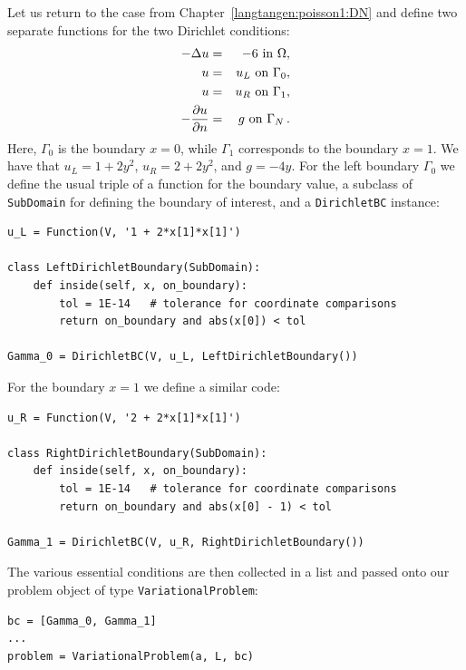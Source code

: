 Let us
return to the case from Chapter~\ref{langtangen:poisson1:DN}
and define two separate functions for
the two Dirichlet conditions:
\begin{eqnarray*}
    - \Delta u &=& -6 \mbox{ in } \Omega, \\
    u &=& u_L \mbox{ on } \Gamma_0, \\
    u &=& u_R \mbox{ on } \Gamma_1, \\
    - {\partial u\over\partial n} &=& g \mbox{ on } \Gamma_N \thinspace .
\end{eqnarray*}
Here, $\Gamma_0$ is the boundary $x=0$, while
$\Gamma_1$ corresponds to the boundary $x=1$.
We have that $u_L = 1 + 2y^2$, $u_R = 2 + 2y^2$, and $g=-4y$.
For the left boundary $\Gamma_0$ we
define
the usual triple of a function for the boundary value,
a subclass of {\fontsize{12pt}{12pt}\texttt{SubDomain}} for defining
the boundary of interest, and a {\fontsize{12pt}{12pt}\texttt{DirichletBC}} instance:
\begin{Verbatim}[fontsize=\fontsize{10pt}{10pt},tabsize=8,baselinestretch=1.05,
fontfamily=tt,xleftmargin=7mm]
u_L = Function(V, '1 + 2*x[1]*x[1]')

class LeftDirichletBoundary(SubDomain):
    def inside(self, x, on_boundary):
        tol = 1E-14   # tolerance for coordinate comparisons
        return on_boundary and abs(x[0]) < tol

Gamma_0 = DirichletBC(V, u_L, LeftDirichletBoundary())
\end{Verbatim}
\noindent
For the boundary $x=1$ we define a similar code:
\begin{Verbatim}[fontsize=\fontsize{10pt}{10pt},tabsize=8,baselinestretch=1.05,
fontfamily=tt,xleftmargin=7mm]
u_R = Function(V, '2 + 2*x[1]*x[1]')

class RightDirichletBoundary(SubDomain):
    def inside(self, x, on_boundary):
        tol = 1E-14   # tolerance for coordinate comparisons
        return on_boundary and abs(x[0] - 1) < tol

Gamma_1 = DirichletBC(V, u_R, RightDirichletBoundary())
\end{Verbatim}
\noindent
The various essential conditions are then collected in a list
and passed onto our problem object of type {\fontsize{12pt}{12pt}\texttt{VariationalProblem}}:
\begin{Verbatim}[fontsize=\fontsize{10pt}{10pt},tabsize=8,baselinestretch=1.05,
fontfamily=tt,xleftmargin=7mm]
bc = [Gamma_0, Gamma_1]
...
problem = VariationalProblem(a, L, bc)
\end{Verbatim}
\noindent

